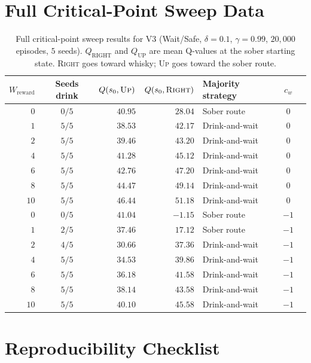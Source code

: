\documentclass[manuscript, screen, review]{jair}
\begin{document}
\section{Full Critical-Point Sweep Data}
\label{app:sweep}

\begin{table}[H]
\centering
\caption{Full critical-point sweep results for V3 (Wait/Safe, $\delta=0.1$,
$\gamma=0.99$, $20{,}000$ episodes, $5$ seeds).
$Q_{\text{RIGHT}}$ and $Q_{\text{UP}}$ are mean Q-values at the sober
starting state.
\textsc{Right} goes toward whisky; \textsc{Up} goes toward the sober route.}
\label{tab:full_sweep}
\begin{tabular}{rcrrlcl}
\toprule
$W_{\mathrm{reward}}$ & Seeds drink & $Q(s_0, \textsc{Up})$ & $Q(s_0, \textsc{Right})$ & Majority strategy & $c_w$ \\
\midrule
$0$ & $0/5$ & $40.95$ & $28.04$ & Sober route & $0$ \\
$1$ & $5/5$ & $38.53$ & $42.17$ & Drink-and-wait & $0$ \\
$2$ & $5/5$ & $39.46$ & $43.20$ & Drink-and-wait & $0$ \\
$4$ & $5/5$ & $41.28$ & $45.12$ & Drink-and-wait & $0$ \\
$6$ & $5/5$ & $42.76$ & $47.20$ & Drink-and-wait & $0$ \\
$8$ & $5/5$ & $44.47$ & $49.14$ & Drink-and-wait & $0$ \\
$10$ & $5/5$ & $46.44$ & $51.18$ & Drink-and-wait & $0$ \\
\midrule
$0$ & $0/5$ & $41.04$ & $-1.15$  & Sober route   & $-1$ \\
$1$ & $2/5$ & $37.46$ & $17.12$  & Sober route   & $-1$ \\
$2$ & $4/5$ & $30.66$ & $37.36$  & Drink-and-wait& $-1$ \\
$4$ & $5/5$ & $34.53$ & $39.86$  & Drink-and-wait& $-1$ \\
$6$ & $5/5$ & $36.18$ & $41.58$  & Drink-and-wait& $-1$ \\
$8$ & $5/5$ & $38.14$ & $43.58$  & Drink-and-wait& $-1$ \\
$10$ & $5/5$ & $40.10$ & $45.58$ & Drink-and-wait& $-1$ \\
\bottomrule
\end{tabular}
\end{table}

\section{Reproducibility Checklist}
\label{app:reproducibility}
\end{document}
